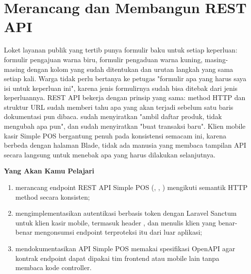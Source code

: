 
\chapter{Merancang dan Membangun REST API}
\label{ch:membangun-rest-api}


Loket layanan publik yang tertib punya formulir baku untuk setiap
keperluan: formulir pengajuan warna biru, formulir pengaduan warna
kuning, masing-masing dengan kolom yang sudah ditentukan dan urutan
langkah yang sama setiap kali. Warga tidak perlu bertanya ke petugas
"formulir apa yang harus saya isi untuk keperluan ini", karena jenis
formulirnya sudah bisa ditebak dari jenis keperluannya. REST API bekerja
dengan prinsip yang sama: method HTTP dan struktur URL sudah memberi
tahu apa yang akan terjadi sebelum satu baris dokumentasi pun dibaca.
 sudah menyiratkan "ambil daftar produk, tidak
mengubah apa pun", dan  sudah menyiratkan
"buat transaksi baru". Klien mobile kasir Simple POS bergantung penuh
pada konsistensi semacam ini, karena berbeda dengan halaman Blade, tidak
ada manusia yang membaca tampilan API secara langsung untuk menebak apa
yang harus dilakukan selanjutnya.

\textbf{Yang Akan Kamu Pelajari}

\begin{enumerate}
  \item merancang endpoint REST API Simple POS (, , ) mengikuti semantik HTTP method secara konsisten;
  \item mengimplementasikan autentikasi berbasis token dengan Laravel Sanctum untuk klien kasir mobile, termasuk header , dan menulis klien yang benar-benar mengonsumsi endpoint terproteksi itu dari luar aplikasi;
  \item mendokumentasikan API Simple POS memakai spesifikasi OpenAPI agar kontrak endpoint dapat dipakai tim frontend atau mobile lain tanpa membaca kode controller.
\end{enumerate}

